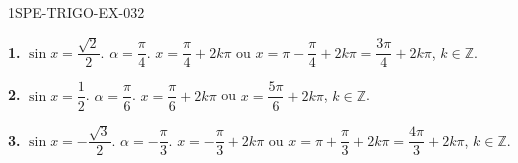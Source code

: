 \begin{corrige}{1SPE-TRIGO-EX-032}

\textbf{1.} $\sin x = \dfrac{\sqrt{2}}{2}$. $\alpha = \dfrac{\pi}{4}$.
$x = \dfrac{\pi}{4} + 2k\pi$ ou $x = \pi - \dfrac{\pi}{4} + 2k\pi = \dfrac{3\pi}{4} + 2k\pi$, $k \in \mathbb{Z}$.

\textbf{2.} $\sin x = \dfrac{1}{2}$. $\alpha = \dfrac{\pi}{6}$.
$x = \dfrac{\pi}{6} + 2k\pi$ ou $x = \dfrac{5\pi}{6} + 2k\pi$, $k \in \mathbb{Z}$.

\textbf{3.} $\sin x = -\dfrac{\sqrt{3}}{2}$. $\alpha = -\dfrac{\pi}{3}$.
$x = -\dfrac{\pi}{3} + 2k\pi$ ou $x = \pi + \dfrac{\pi}{3} + 2k\pi = \dfrac{4\pi}{3} + 2k\pi$, $k \in \mathbb{Z}$.

\end{corrige}
